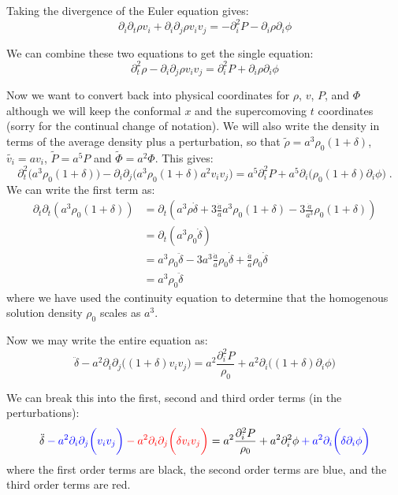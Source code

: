 \documentclass{article}
\newcommand{ \wt }{\widetilde}
\newcommand*{\mathcolor}{}
\def\mathcolor#1#{\mathcoloraux{#1}}
\newcommand*{\mathcoloraux}[3]{%
  \protect\leavevmode
  \begingroup
    \color#1{#2}#3%
  \endgroup
}
\begin{document}
Taking the divergence of the Euler equation gives:
\begin{equation}
  \partial_i \partial_t \rho v_i + \partial_i \partial_j  \rho v_i v_j
      = - \partial_i^2 P - \partial_i \rho \partial_i \phi 
\end{equation}

We can combine these two equations to get the single equation:
\begin{equation} 
  \partial_t^2 \rho - \partial_i \partial_j \rho v_i v_j =  \partial_i^2 P + \partial_i \rho \partial_i \phi
\end{equation}

Now we want to convert back into physical coordinates for $\rho$, $v$, $P$, and $\Phi$ although we will keep the conformal $x$ and the supercomoving $t$ coordinates (sorry for the continual change of notation).   We will also write the density in terms of the average density plus a perturbation, so that $\wt{\rho} = a^3 \rho_0 (1+\delta)$, $\wt{v_i} = a v_i$, $\wt{P} = a^5 P$ and $\wt{\Phi} = a^2 \Phi$.  This gives:
\begin{equation}
\partial_t^2 \bigg(a^3 \rho_0 (1+\delta) \bigg)
  - \partial_i \partial_j \bigg(a^3 \rho_0 (1+\delta) a^2 v_i
  v_j\bigg)  =  a^5 \partial_i^2 P + a^5 \partial_i \bigg(\rho_0 (1+\delta) \partial_i \phi \bigg)\;.
\end{equation}
We can write the first term as:
\begin{align*}
  \partial_t \partial_t ( a^3 \rho_0 (1+\delta) ) &= \partial_t( a^3 \rho \dot{\delta} + 3 \frac{\dot{a}}{a} a^3 \rho_0 (1+\delta) - 3 \frac{\dot{a}}{a^3} \rho_0 (1+\delta)) \\
&= \partial_t( a^3 \rho_0 \dot{\delta})\\
&= a^3 \rho_0 \ddot{\delta} - 3 a^3 \frac{\dot{a}}{a} \rho_0 \dot{\delta} + \frac{\dot{a}}{a} \rho_0 \dot{\delta} \\
&= a^3 \rho_0 \ddot{\delta} 
\end{align*}
where we have used the continuity equation to determine that the homogenous solution density $\rho_0$ scales as $a^3$.

Now we may write the entire equation as:
\begin{equation}
  \ddot{\delta} - a^2 \partial_i \partial_j \bigg((1+\delta) v_i v_j\bigg) =  a^2 \frac{\partial_i^2 P}{\rho_0} + a^2  \partial_i \bigg((1+\delta) \partial_i \phi \bigg)
\end{equation}

We can break this into the first, second and third order terms (in the
perturbations):
\begin{equation}
  \ddot{\delta}  \mathcolor{blue}{- a^2 \partial_i \partial_j \bigg(
    v_i v_j \bigg) }  \mathcolor{red}{-a^2 \partial_i \partial_j
    \bigg( \delta v_i v_j \bigg) } = a^2 \frac{\partial_i^2 P
  }{\rho_0}  + a^2 \partial_i^2 \phi  \mathcolor{blue}{+
    a^2 \partial_i \bigg( \delta \partial_i \phi \bigg) } 
\end{equation}
where the first order terms are black, the second order terms are
blue, and the third order terms are red.
\end{document}
